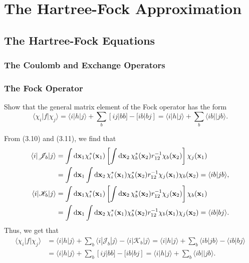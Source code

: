 \documentclass[a4paper]{book}
\newcounter{exercise}[chapter]
\newcounter{solution}[chapter]
\newcommand*{\dif}{\mathop{}\!\mathrm{d}}
\newcommand{\bfx}{{\bf x}}
\begin{document}
	
	\tableofcontents

	\chapter{The Hartree-Fock Approximation}
	
	\section{The Hartree-Fock Equations}
	
	\subsection{The Coulomb and Exchange Operators}
	
	\subsection{The Fock Operator}
	
	\begin{exercise}
	Show that the general matrix element of the Fock operator has the form
	\[
		\langle \chi_i | f | \chi_j \rangle = \langle i | h | j \rangle + \sum_b [ij|bb] - [ib|bj] = \langle i | h | j \rangle + \sum_b \langle ib || jb \rangle .
	\]
	\end{exercise}
	
	\begin{solution}
	
	From (3.10) and (3.11), we find that
	\begin{align*}
		\langle i | \mathscr{J}_b | j \rangle &= \int \dif \bfx_1 \chi^*_i( \bfx_1 ) \left[ \int \dif \bfx_2 \, \chi^*_b( \bfx_2 ) r^{-1}_{12} \chi_b( \bfx_2 ) \right] \chi_j( \bfx_1 ) \\
		& =  \int \dif \bfx_1 \int \dif \bfx_2 \, \chi^*_i( \bfx_1 ) \chi^*_b( \bfx_2 ) r^{-1}_{12} \chi_j( \bfx_1 ) \chi_b( \bfx_2 ) = \langle ib | jb \rangle , \\
		\langle i | \mathscr{K}_b | j \rangle &= \int \dif \bfx_1 \chi^*_i( \bfx_1 ) \left[ \int \dif \bfx_2 \, \chi^*_b( \bfx_2 ) r^{-1}_{12} \chi_j( \bfx_2 ) \right] \chi_b( \bfx_1 ) \\
		& =  \int \dif \bfx_1 \int \dif \bfx_2 \, \chi^*_i( \bfx_1 ) \chi^*_b( \bfx_2 ) r^{-1}_{12} \chi_b( \bfx_1 ) \chi_j( \bfx_2 ) = \langle ib | bj \rangle .
	\end{align*}
	Thus, we get that
	\begin{align*}
		\langle \chi_i | f | \chi_j \rangle &= \langle i | h | j \rangle + \sum_b \langle i | \mathscr{J}_b | j \rangle - \langle i | \mathscr{K}_b | j \rangle = \langle i | h | j \rangle + \sum_b \langle i b | j b \rangle - \langle i b | b j \rangle \\
		&= \langle i | h | j \rangle + \sum_b [ ij | bb ] - [ ib | bj ] = \langle i | h | j \rangle + \sum_b \langle i b || j b \rangle .
	\end{align*}
	
	\end{solution}
	
\end{document}
